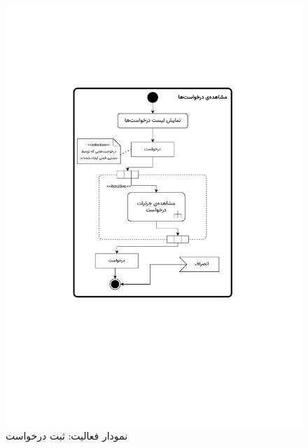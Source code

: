 \begin{figure}[ht!]
	\centering
	\includegraphics[scale=0.8, page=9]{figs/OOD-activity11-20.pdf}
	\caption{نمودار فعالیت: ثبت درخواست}
\end{figure}
\FloatBarrier
\newpage

